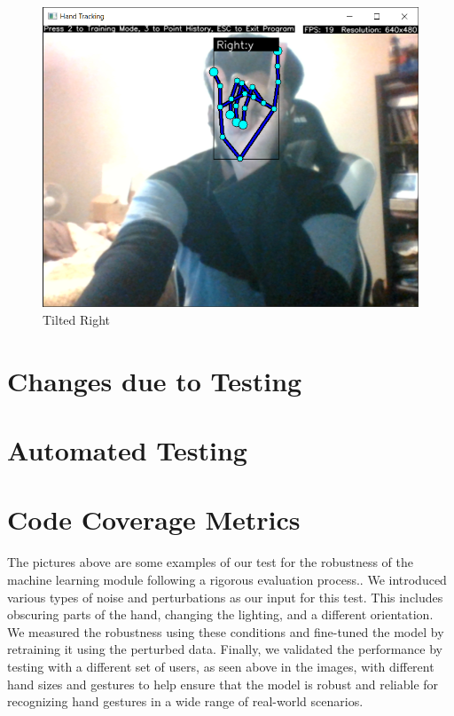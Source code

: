 \documentclass[12pt, titlepage]{article}
\begin{document}
\begin{figure}[!htb]
  \includegraphics[width=\linewidth]{right_y.png}
  \caption{Tilted Right}\label{fig:Tilted Right}
\endminipage\hfill

\end{figure}



\section{Changes due to Testing}


\section{Automated Testing}


\section{Code Coverage Metrics}





The pictures above are some examples of our test for the robustness of the machine learning module following a 
rigorous evaluation process.. We introduced various types of noise and perturbations as our input for this test.
 This includes obscuring parts of the hand, changing the lighting, and a different orientation. We measured 
 the robustness using these conditions and fine-tuned the model by retraining it using the perturbed data. 
 Finally, we validated the performance by testing with a different set of users, as seen above in the images,
  with different hand sizes and gestures to help ensure that the model is robust and reliable for recognizing 
  hand gestures in a wide range of real-world scenarios.
\end{document}
